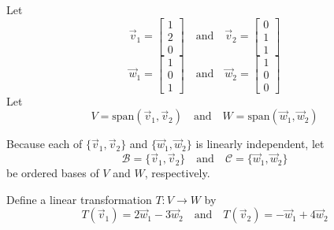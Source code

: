 \documentclass{ximera}
\begin{document}
\begin{example}\label{ex:subtosub1}
Let
$$\vec{v}_1=\begin{bmatrix}1\\2\\0\end{bmatrix}\quad\text{and}\quad\vec{v}_2=\begin{bmatrix}0\\1\\1\end{bmatrix}$$
$$\vec{w}_1=\begin{bmatrix}1\\0\\1\end{bmatrix}\quad\text{and}\quad\vec{w}_2=\begin{bmatrix}1\\0\\0\end{bmatrix}$$
Let $$V=\text{span}(\vec{v}_1, \vec{v}_2)\quad\text{and}\quad W=\text{span}(\vec{w}_1, \vec{w}_2)$$

Because each of $\{\vec{v}_1, \vec{v}_2\}$ and $\{\vec{w}_1, \vec{w}_2\}$ is linearly independent, let 
$$\mathcal{B}=\{\vec{v}_1, \vec{v}_2\}\quad\text{and}\quad\mathcal{C}=\{\vec{w}_1, \vec{w}_2\}$$
be ordered bases of $V$ and $W$, respectively.


Define a linear transformation $T:V\rightarrow W$ by 
$$T(\vec{v}_1)=2\vec{w}_1-3\vec{w}_2\quad\text{and} \quad T(\vec{v}_2)=-\vec{w}_1+4\vec{w}_2$$


\end{example}
\end{document}
